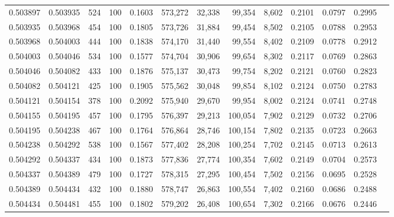 \begin{tabular}{rrrrrrrrrrrrr}
0.503897 & 0.503935 &   524 & 100 &                                     0.1603 & 573,272 &  32,338 &  99,354 &   8,602 & 0.2101 & 0.0797 & 0.2995 \\
0.503935 & 0.503968 &   454 & 100 &                                     0.1805 & 573,726 &  31,884 &  99,454 &   8,502 & 0.2105 & 0.0788 & 0.2953 \\
0.503968 & 0.504003 &   444 & 100 &                                     0.1838 & 574,170 &  31,440 &  99,554 &   8,402 & 0.2109 & 0.0778 & 0.2912 \\
0.504003 & 0.504046 &   534 & 100 &                                     0.1577 & 574,704 &  30,906 &  99,654 &   8,302 & 0.2117 & 0.0769 & 0.2863 \\
0.504046 & 0.504082 &   433 & 100 &                                     0.1876 & 575,137 &  30,473 &  99,754 &   8,202 & 0.2121 & 0.0760 & 0.2823 \\
0.504082 & 0.504121 &   425 & 100 &                                     0.1905 & 575,562 &  30,048 &  99,854 &   8,102 & 0.2124 & 0.0750 & 0.2783 \\
0.504121 & 0.504154 &   378 & 100 &                                     0.2092 & 575,940 &  29,670 &  99,954 &   8,002 & 0.2124 & 0.0741 & 0.2748 \\
0.504155 & 0.504195 &   457 & 100 &                                     0.1795 & 576,397 &  29,213 & 100,054 &   7,902 & 0.2129 & 0.0732 & 0.2706 \\
0.504195 & 0.504238 &   467 & 100 &                                     0.1764 & 576,864 &  28,746 & 100,154 &   7,802 & 0.2135 & 0.0723 & 0.2663 \\
0.504238 & 0.504292 &   538 & 100 &                                     0.1567 & 577,402 &  28,208 & 100,254 &   7,702 & 0.2145 & 0.0713 & 0.2613 \\
0.504292 & 0.504337 &   434 & 100 &                                     0.1873 & 577,836 &  27,774 & 100,354 &   7,602 & 0.2149 & 0.0704 & 0.2573 \\
0.504337 & 0.504389 &   479 & 100 &                                     0.1727 & 578,315 &  27,295 & 100,454 &   7,502 & 0.2156 & 0.0695 & 0.2528 \\
0.504389 & 0.504434 &   432 & 100 &                                     0.1880 & 578,747 &  26,863 & 100,554 &   7,402 & 0.2160 & 0.0686 & 0.2488 \\
0.504434 & 0.504481 &   455 & 100 &                                     0.1802 & 579,202 &  26,408 & 100,654 &   7,302 & 0.2166 & 0.0676 & 0.2446 \\

\end{tabular}

